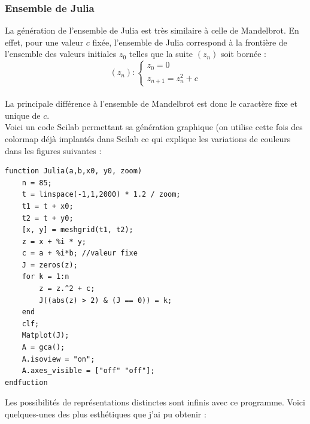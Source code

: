          \subsubsection{Ensemble de Julia}
         La génération de l'ensemble de Julia est très similaire à celle  de Mandelbrot. En effet, pour une valeur $c$ fixée, l'ensemble de Julia correspond à la frontière de l'ensemble des valeurs initiales $z_0$ telles que la suite $(z_n)$ soit bornée :
         $$(z_n) : \left\{
                \begin{array}{ll}
                    z_0=0\\
                    z_{n+1}=z_n^2 + c                    
                \end{array}
            \right.$$
        \\ La principale différence à l'ensemble de Mandelbrot est donc le caractère fixe et unique de $c$.
         \\Voici un code Scilab permettant sa génération graphique (on utilise cette fois des colormap déjà implantés dans Scilab ce qui explique les variations de couleurs dans les figures suivantes :
         \begin{center}
                \begin{verbatim}
function Julia(a,b,x0, y0, zoom)
    n = 85;
    t = linspace(-1,1,2000) * 1.2 / zoom;
    t1 = t + x0;
    t2 = t + y0;
    [x, y] = meshgrid(t1, t2);
    z = x + %i * y;
    c = a + %i*b; //valeur fixe
    J = zeros(z);
    for k = 1:n
        z = z.^2 + c;
        J((abs(z) > 2) & (J == 0)) = k;
    end
    clf;
    Matplot(J);
    A = gca();
    A.isoview = "on";
    A.axes_visible = ["off" "off"];
endfuction
                \end{verbatim}
                \label{lst:code_5}
         \end{center}
            Les possibilités de représentations distinctes sont infinis avec ce programme. Voici quelques-unes des plus esthétiques  que j'ai pu obtenir :
